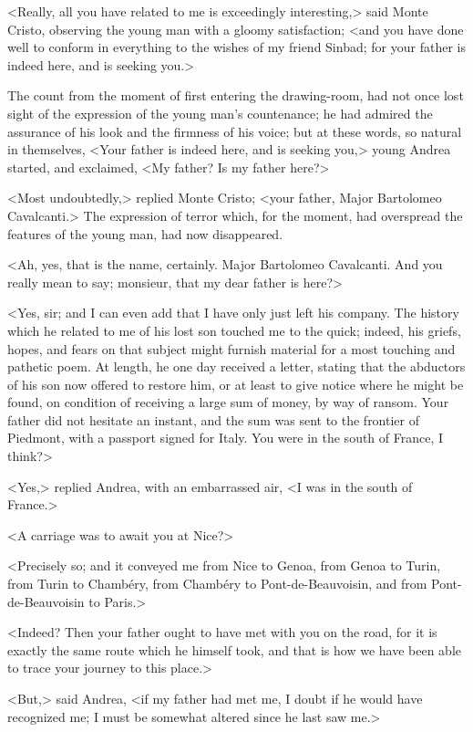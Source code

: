  <Really, all you have related to me is exceedingly interesting,> said Monte Cristo, observing the young man with a gloomy satisfaction; <and you have done well to conform in everything to the wishes of my friend Sinbad; for your father is indeed here, and is seeking you.> 

 The count from the moment of first entering the drawing-room, had not once lost sight of the expression of the young man's countenance; he had admired the assurance of his look and the firmness of his voice; but at these words, so natural in themselves, <Your father is indeed here, and is seeking you,> young Andrea started, and exclaimed, <My father? Is my father here?> 

 <Most undoubtedly,> replied Monte Cristo; <your father, Major Bartolomeo Cavalcanti.> The expression of terror which, for the moment, had overspread the features of the young man, had now disappeared. 

 <Ah, yes, that is the name, certainly. Major Bartolomeo Cavalcanti. And you really mean to say; monsieur, that my dear father is here?> 

 <Yes, sir; and I can even add that I have only just left his company. The history which he related to me of his lost son touched me to the quick; indeed, his griefs, hopes, and fears on that subject might furnish material for a most touching and pathetic poem. At length, he one day received a letter, stating that the abductors of his son now offered to restore him, or at least to give notice where he might be found, on condition of receiving a large sum of money, by way of ransom. Your father did not hesitate an instant, and the sum was sent to the frontier of Piedmont, with a passport signed for Italy. You were in the south of France, I think?> 

 <Yes,> replied Andrea, with an embarrassed air, <I was in the south of France.> 

 <A carriage was to await you at Nice?> 

 <Precisely so; and it conveyed me from Nice to Genoa, from Genoa to Turin, from Turin to Chambéry, from Chambéry to Pont-de-Beauvoisin, and from Pont-de-Beauvoisin to Paris.>

<Indeed? Then your father ought to have met with you on the road, for it is exactly the same route which he himself took, and that is how we have been able to trace your journey to this place.> 

 <But,> said Andrea, <if my father had met me, I doubt if he would have recognized me; I must be somewhat altered since he last saw me.> 

